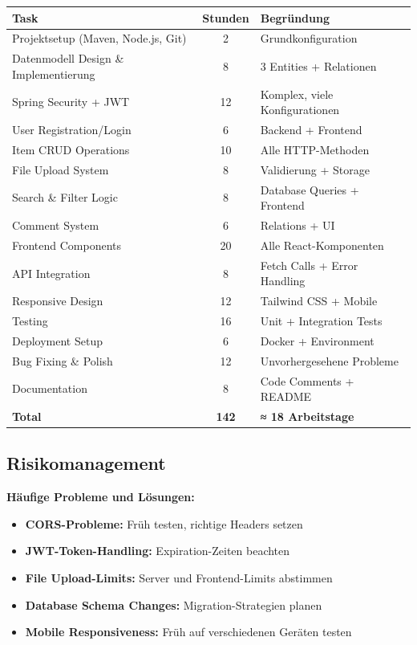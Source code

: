 \documentclass[a4paper,12pt]{article}
\begin{document}
\begin{center}
\begin{tabularx}{\textwidth}{|X|c|X|}
\hline
\textbf{Task} & \textbf{Stunden} & \textbf{Begründung} \\
\hline
Projektsetup (Maven, Node.js, Git) & 2 & Grundkonfiguration \\
\hline
Datenmodell Design \& Implementierung & 8 & 3 Entities + Relationen \\
\hline
Spring Security + JWT & 12 & Komplex, viele Konfigurationen \\
\hline
User Registration/Login & 6 & Backend + Frontend \\
\hline
Item CRUD Operations & 10 & Alle HTTP-Methoden \\
\hline
File Upload System & 8 & Validierung + Storage \\
\hline
Search \& Filter Logic & 8 & Database Queries + Frontend \\
\hline
Comment System & 6 & Relations + UI \\
\hline
Frontend Components & 20 & Alle React-Komponenten \\
\hline
API Integration & 8 & Fetch Calls + Error Handling \\
\hline
Responsive Design & 12 & Tailwind CSS + Mobile \\
\hline
Testing & 16 & Unit + Integration Tests \\
\hline
Deployment Setup & 6 & Docker + Environment \\
\hline
Bug Fixing \& Polish & 12 & Unvorhergesehene Probleme \\
\hline
Documentation & 8 & Code Comments + README \\
\hline
\textbf{Total} & \textbf{142} & \textbf{≈ 18 Arbeitstage} \\
\hline
\end{tabularx}
\end{center}

\subsection{Risikomanagement}

\textbf{Häufige Probleme und Lösungen:}

\begin{itemize}
    \item \textbf{CORS-Probleme:} Früh testen, richtige Headers setzen
    \item \textbf{JWT-Token-Handling:} Expiration-Zeiten beachten
    \item \textbf{File Upload-Limits:} Server und Frontend-Limits abstimmen
    \item \textbf{Database Schema Changes:} Migration-Strategien planen
    \item \textbf{Mobile Responsiveness:} Früh auf verschiedenen Geräten testen
\end{itemize}
\end{document}

